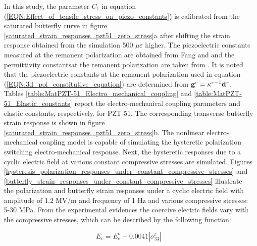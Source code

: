  
In this study, the parameter $C_1$ in equation
(\ref{EQN:Effect_of_tensile_stress_on_piezo_constants}) is calibrated from the saturated butterfly curve in figure \ref{saturated_strain_responses_pzt51_zero_stress}a after shifting the strain response obtained from the simulation 500 $\mu \varepsilon$ higher.
The piezoelectric constants measured at the remanent polarization are obtained
from Fang and \cite{Li2004959} and the permittivity constantsat the remanent polarization are taken from \cite{Muliana2011}.
It is noted that the piezoelectric constants at the remanent polarization used in equation (\ref{EQN:3d_pol_constitutive_equation}) are determined from ${{\bf{g}}^r} = {{\mathbf{\kappa }}^r}^{ - 1}{{\bf{d}}^r}$. 
Tables \ref{table:MatPZT-51_Electro_mechanical_coupling} and \ref{table:MatPZT-51_Elastic_constants} report the electro-mechanical coupling parameters and elastic constants, respectively, for PZT-51. 
The corresponding transverse butterfly strain response is shown in figure \ref{saturated_strain_responses_pzt51_zero_stress}b. 
The nonlinear electro-mechanical coupling model is capable of simulating the hysteretic polarization switching electro-mechanical response.
Next, the hysteretic responses due to a cyclic electric field at various constant compressive stresses are simulated. 
Figures \ref{hysteresis_polarization_responses_under_constant_compressive_stresses} and \ref{butterfly_strain_responses_under_constant_compressive_stresses} illustrate the polarization and butterfly strain responses under a cyclic electric field with amplitude of 1.2 MV/m and frequency of 1 Hz and various compressive stresses: 5-30 MPa. 
From the experimental evidences the coercive electric fields vary with the compressive stresses, which can be described by the following function:

\begin{equation}  
{E_c} = E_c^o - 0.0041\left| {\sigma _{33}^t} \right|
\label{EQN:effect_of_stress_on_coercive_field}
\end{equation}

